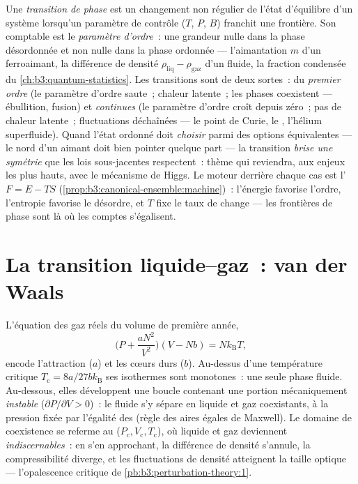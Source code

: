 \begin{definition}\label{def:b3:phase-transitions:order}
Une \emph{transition de phase} est un changement non régulier de
l'état d'équilibre d'un système lorsqu'un paramètre de contrôle
($T$, $P$, $B$) franchit une frontière. Son comptable est le
\emph{paramètre d'ordre}~: une grandeur nulle dans la phase
désordonnée et non nulle dans la phase ordonnée --- l'aimantation
$m$ d'un ferroaimant, la différence de densité
$\rho_{\text{liq}} - \rho_{\text{gaz}}$ d'un fluide, la fraction
condensée du \cref{ch:b3:quantum-statistics}. Les transitions sont
de deux sortes~: du \emph{premier ordre} (le paramètre d'ordre
saute~; chaleur latente~; les phases coexistent --- ébullition,
fusion) et \emph{continues} (le paramètre d'ordre croît depuis
zéro~; pas de chaleur latente~; fluctuations déchaînées --- le point
de Curie, le , l'hélium superfluide). Quand l'état
ordonné doit \emph{choisir} parmi des options équivalentes --- le
nord d'un aimant doit bien pointer quelque part --- la transition
\emph{brise une symétrie} que les lois sous-jacentes respectent~:
thème qui reviendra, aux enjeux les plus hauts, avec le mécanisme de
Higgs. Le moteur derrière chaque cas est l' $F = E - TS$
(\cref{prop:b3:canonical-ensemble:machine})~: l'énergie favorise
l'ordre, l'entropie favorise le désordre, et $T$ fixe le taux de
change --- les frontières de phase sont là où les comptes s'égalisent.
\end{definition}

\section{La transition liquide--gaz~: van der Waals}

\begin{proposition}\label{prop:b3:phase-transitions:vdw}
L'équation des gaz réels du volume de première année,
\[
\Big(P + \frac{aN^2}{V^2}\Big)(V - Nb) = Nk_{\text{B}}T ,
\]
encode l'attraction ($a$) et les cœurs durs ($b$). Au-dessus d'une
température critique $T_{\text{c}} = 8a/27bk_{\text{B}}$ ses
isothermes sont monotones~: une seule phase fluide. Au-dessous,
elles développent une boucle contenant une portion mécaniquement
\emph{instable} ($\partial P/\partial V >
0$)~: le fluide s'y sépare en liquide et gaz coexistants, à la
pression fixée par l'égalité des  (règle des
aires égales de Maxwell). Le domaine de coexistence se referme au
 ($P_{\text{c}}, V_{\text{c}}, T_{\text{c}}$), où
liquide et gaz deviennent \emph{indiscernables}~: en s'en
approchant, la différence de densité s'annule, la compressibilité
diverge, et les fluctuations de densité atteignent la taille
optique --- l'opalescence critique de
\cref{pb:b3:perturbation-theory:1}.
\end{proposition}
\admitted

